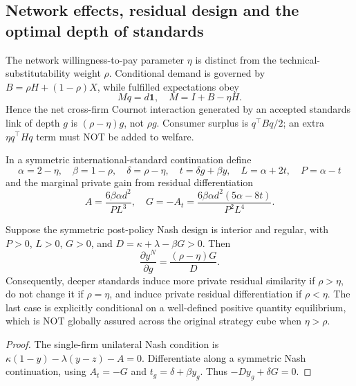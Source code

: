 \subsection{Network effects, residual design and the optimal depth of standards}

The network willingness-to-pay parameter $\eta$ is distinct from the
technical-substitutability weight $\rho$. Conditional demand is governed
by $B=\rho H+(1-\rho)X$, while fulfilled expectations obey
\[
 Mq=d\mathbf{1},\quad M=I+B-\eta H.
\]
Hence the net cross-firm Cournot interaction generated by an accepted
standards link of depth $g$ is $(\rho-\eta)g$, not $\rho g$.
Consumer surplus is $q^\top Bq/2$; an extra $\eta q^\top Hq$
term must NOT be added to welfare.

In a symmetric international-standard continuation define
\[
 \alpha=2-\eta,\quad\beta=1-\rho,\quad\delta=\rho-\eta,\quad
 t=\delta g+\beta y,\quad L=\alpha+2t,\quad P=\alpha-t
\]
and the marginal private gain from residual differentiation
\[
 A=\frac{6\beta\alpha d^2}{PL^3},\quad
 G=-A_t=\frac{6\beta\alpha d^2(5\alpha-8t)}{P^2L^4}.
\]

\begin{proposition}
Suppose the symmetric post-policy Nash design is interior and regular,
with $P>0$, $L>0$, $G>0$, and
$D=\kappa+\lambda-\beta G>0$. Then
\[
 \frac{\partial y^N}{\partial g}=
 \frac{(\rho-\eta)G}{D}.
\]
Consequently, deeper standards induce more private residual similarity
if $\rho>\eta$, do not change it if $\rho=\eta$, and induce private
residual differentiation if $\rho<\eta$.
The last case is explicitly conditional on a well-defined positive
quantity equilibrium, which is NOT globally assured across the original
strategy cube when $\eta>\rho$.
\end{proposition}
\begin{proof}
The single-firm unilateral Nash condition is
$\kappa(1-y)-\lambda(y-z)-A=0$.
Differentiate along a symmetric Nash continuation, using
$A_t=-G$ and $t_g=\delta+\beta y_g$.
Thus $-D y_g+\delta G=0$.
\end{proof}

